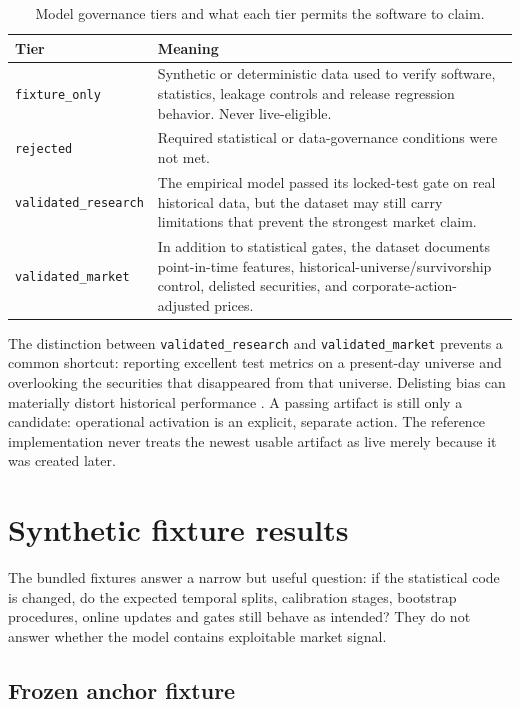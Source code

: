 \documentclass[11pt]{article}
\begin{document}
\begin{table}[tbp]
\centering
\small
\caption{Model governance tiers and what each tier permits the software to claim.}
\label{tab:tiers}
\begin{tabularx}{\textwidth}{@{}>{\raggedright\arraybackslash}p{}X@{}}
\toprule
Tier & Meaning \\
\midrule
\texttt{fixture\_only} & Synthetic or deterministic data used to verify software, statistics, leakage controls and release regression behavior. Never live-eligible. \\
\texttt{rejected} & Required statistical or data-governance conditions were not met. \\
\texttt{validated\_research} & The empirical model passed its locked-test gate on real historical data, but the dataset may still carry limitations that prevent the strongest market claim. \\
\texttt{validated\_market} & In addition to statistical gates, the dataset documents point-in-time features, historical-universe/survivorship control, delisted securities, and corporate-action-adjusted prices. \\
\bottomrule
\end{tabularx}
\end{table}

The distinction between \texttt{validated\_research} and \texttt{validated\_market} prevents a common shortcut: reporting excellent test metrics on a present-day universe and overlooking the securities that disappeared from that universe. Delisting bias can materially distort historical performance \citep{shumway1997delisting}. A passing artifact is still only a candidate: operational activation is an explicit, separate action. The reference implementation never treats the newest usable artifact as live merely because it was created later.

\section{Synthetic fixture results}
\label{sec:fixtures}

The bundled fixtures answer a narrow but useful question: if the statistical code is changed, do the expected temporal splits, calibration stages, bootstrap procedures, online updates and gates still behave as intended? They do not answer whether the model contains exploitable market signal.

\subsection{Frozen anchor fixture}
\end{document}
